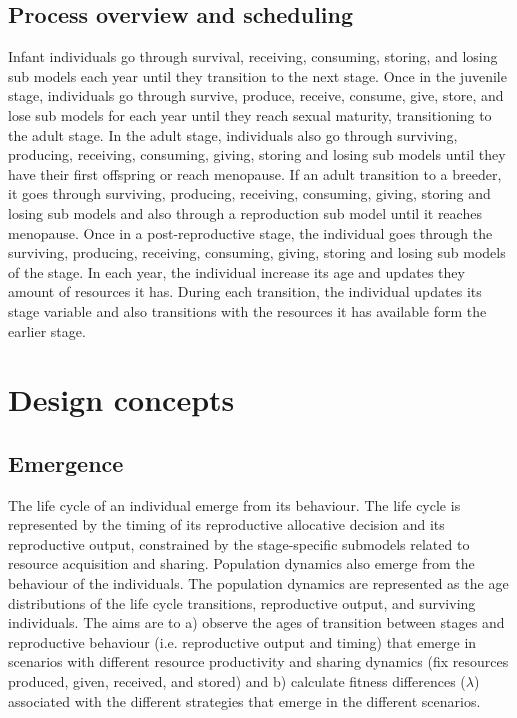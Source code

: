 \documentclass{article}
\begin{document}
\subsection{Process overview and scheduling}

Infant individuals go through survival, receiving, consuming, storing, and losing sub models each year until they transition to the next stage. Once in the juvenile stage, individuals go through survive, produce, receive, consume, give, store, and lose sub models for each year until they reach sexual maturity, transitioning to the adult stage. In the adult stage, individuals also go through surviving, producing, receiving, consuming, giving, storing and losing sub models until they have their first offspring or reach menopause. If an adult transition to a breeder, it goes through surviving, producing, receiving, consuming, giving, storing and losing sub models and also through a reproduction sub model until it reaches menopause. Once in a post-reproductive stage, the individual goes through the surviving, producing, receiving, consuming, giving, storing and losing sub models of the stage. In each year, the individual increase its age and updates they amount of resources it has. During each transition, the individual updates its stage variable and also transitions with the resources it has available form the earlier stage.

\section{Design concepts}

\subsection{Emergence}

 The life cycle of an individual emerge from its behaviour. The life cycle is represented by the timing of its reproductive allocative decision and its reproductive output, constrained by the stage-specific submodels related to resource acquisition and sharing. Population dynamics also emerge from the behaviour of the individuals. The population dynamics are represented as the age distributions of the life cycle transitions, reproductive output, and surviving individuals. The aims are to a) observe the ages of transition between stages and reproductive behaviour (i.e. reproductive output and timing) that emerge in scenarios with different resource productivity and sharing dynamics (fix resources produced, given, received, and stored) and b) calculate fitness differences ($\lambda$) associated with the different strategies that emerge in the different scenarios.
 
\end{document}
